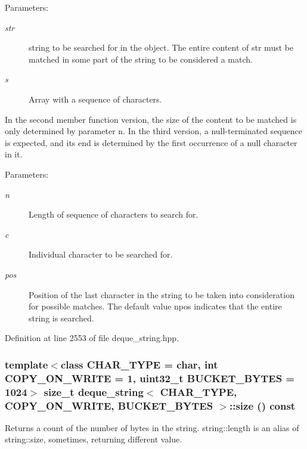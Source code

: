 \begin{Desc}
\item[Parameters:]
\begin{description}
\item[{\em str}]string to be searched for in the object. The entire content of str must be matched in some part of the string to be considered a match. \item[{\em s}]Array with a sequence of characters.\end{description}
\end{Desc}
In the second member function version, the size of the content to be matched is only determined by parameter n. In the third version, a null-terminated sequence is expected, and its end is determined by the first occurrence of a null character in it. \begin{Desc}
\item[Parameters:]
\begin{description}
\item[{\em n}]Length of sequence of characters to search for. \item[{\em c}]Individual character to be searched for. \item[{\em pos}]Position of the last character in the string to be taken into consideration for possible matches. The default value npos indicates that the entire string is searched. \end{description}
\end{Desc}


Definition at line 2553 of file deque\_\-string.hpp.\hypertarget{classdeque__string_52cac1c0f0f3f5557773b4f7ce9d53b7}{
\subsubsection[{size}]{\setlength{\rightskip}{0pt plus 5cm}template$<$class CHAR\_\-TYPE  = char, int COPY\_\-ON\_\-WRITE = 1, uint32\_\-t BUCKET\_\-BYTES = 1024$>$ size\_\-t {\bf deque\_\-string}$<$ CHAR\_\-TYPE, COPY\_\-ON\_\-WRITE, BUCKET\_\-BYTES $>$::size () const}}
\label{classdeque__string_52cac1c0f0f3f5557773b4f7ce9d53b7}


Returns a count of the number of bytes in the string. string::length is an alias of string::size, sometimes, returning different value. 

